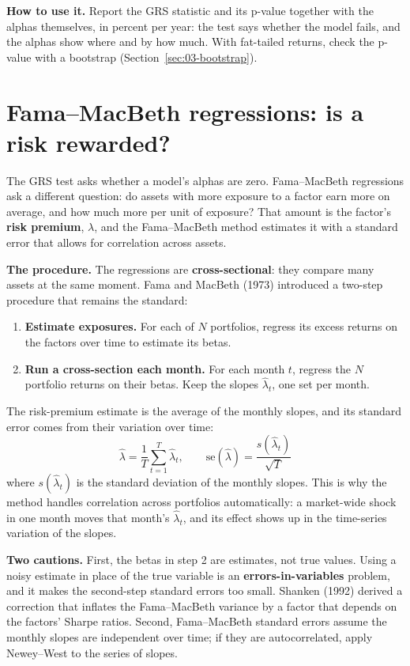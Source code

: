 \textbf{How to use it.} Report the GRS statistic and its p-value together with
the alphas themselves, in percent per year: the test says whether the model
fails, and the alphas show where and by how much. With fat-tailed returns,
check the p-value with a bootstrap (Section~\ref{sec:03-bootstrap}).

\section{Fama--MacBeth regressions: is a risk rewarded?}
\label{sec:03-fmb}

The GRS test asks whether a model's alphas are zero. Fama--MacBeth regressions
ask a different question: do assets with more exposure to a factor earn more on
average, and how much more per unit of exposure? That amount is the factor's
\textbf{risk premium}, $\lambda$, and the Fama--MacBeth method estimates it with
a standard error that allows for correlation across assets.

\textbf{The procedure.} The regressions are \textbf{cross-sectional}: they
compare many assets at the same moment. Fama and MacBeth (1973) introduced a
two-step procedure that remains the standard:

\begin{enumerate}
  \item \textbf{Estimate exposures.} For each of $N$ portfolios, regress its excess returns on the factors over time to estimate its betas.
  \item \textbf{Run a cross-section each month.} For each month $t$, regress the $N$ portfolio returns on their betas. Keep the slopes $\hat\lambda_t$, one set per month.
\end{enumerate}

The risk-premium estimate is the average of the monthly slopes, and its standard
error comes from their variation over time:
\begin{equation}
  \hat\lambda = \frac{1}{T}\sum_{t=1}^{T}\hat\lambda_t, \qquad \mathrm{se}(\hat\lambda) = \frac{s(\hat\lambda_t)}{\sqrt{T}}
  \label{eq:03-fmb}
\end{equation}
where $s(\hat\lambda_t)$ is the standard deviation of the monthly slopes. This
is why the method handles correlation across portfolios automatically: a
market-wide shock in one month moves that month's $\hat\lambda_t$, and its
effect shows up in the time-series variation of the slopes.

\textbf{Two cautions.} First, the betas in step 2 are estimates, not true
values. Using a noisy estimate in place of the true variable is an
\textbf{errors-in-variables} problem, and it makes the second-step standard
errors too small. Shanken (1992) derived a correction that inflates the
Fama--MacBeth variance by a factor that depends on the factors' Sharpe ratios.
Second, Fama--MacBeth standard errors assume the monthly slopes are independent
over time; if they are autocorrelated, apply Newey--West to the series of
slopes.

